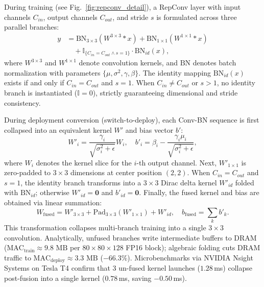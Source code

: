 \documentclass[conference]{IEEEtran}
\begin{document}
During training (see Fig.~\ref{fig:repconv_detail}), a RepConv layer with input channels $C_{in}$, output channels $C_{out}$, and stride $s$ is formulated across three parallel branches:
\begin{equation}
\begin{aligned}
y &= \text{BN}_{3\times3}(W^{3\times3} * x) + \text{BN}_{1\times1}(W^{1\times1} * x) \\
&\quad + \mathbb{I}_{\{C_{in}=C_{out} \land s=1\}} \cdot \text{BN}_{id}(x),
\end{aligned}
\end{equation}
where $W^{3\times3}$ and $W^{1\times1}$ denote convolution kernels, and $\text{BN}$ denotes batch normalization with parameters $\{\mu, \sigma^2, \gamma, \beta\}$. The identity mapping $\text{BN}_{id}(x)$ exists if and only if $C_{in} = C_{out}$ and $s = 1$. When $C_{in} \neq C_{out}$ or $s > 1$, no identity branch is instantiated ($\mathbb{I} = 0$), strictly guaranteeing dimensional and stride consistency.

During deployment conversion (switch-to-deploy), each Conv-BN sequence is first collapsed into an equivalent kernel $W'$ and bias vector $b'$:
\begin{equation}
W'_i = \frac{\gamma_i}{\sqrt{\sigma_i^2 + \epsilon}} W_i, \quad b'_i = \beta_i - \frac{\gamma_i \mu_i}{\sqrt{\sigma_i^2 + \epsilon}},
\end{equation}
where $W_i$ denotes the kernel slice for the $i$-th output channel. Next, $W'_{1\times1}$ is zero-padded to $3\times3$ dimensions at center position $(2,2)$. When $C_{in}=C_{out}$ and $s=1$, the identity branch transforms into a $3\times3$ Dirac delta kernel $W'_{id}$ folded with $\text{BN}_{id}$; otherwise $W'_{id} = \mathbf{0}$ and $b'_{id} = \mathbf{0}$. Finally, the fused kernel and bias are obtained via linear summation:
\begin{equation}
W_{\text{fused}} = W'_{3\times3} + \text{Pad}_{3\times3}(W'_{1\times1}) + W'_{id}, \quad b_{\text{fused}} = \sum_k b'_k.
\end{equation}
This transformation collapses multi-branch training into a single $3\times3$ convolution. Analytically, unfused branches write intermediate buffers to DRAM ($\text{MAC}_{\text{train}} \approx 9.8\text{~MB}$ per $80\times80\times128$ FP16 block); algebraic folding cuts DRAM traffic to $\text{MAC}_{\text{deploy}} \approx 3.3\text{~MB}$ ($-66.3\%$). Microbenchmarks via NVIDIA Nsight Systems on Tesla T4 confirm that 3 un-fused kernel launches ($1.28$\,ms) collapse post-fusion into a single kernel ($0.78$\,ms, saving $-0.50$\,ms).
\end{document}
